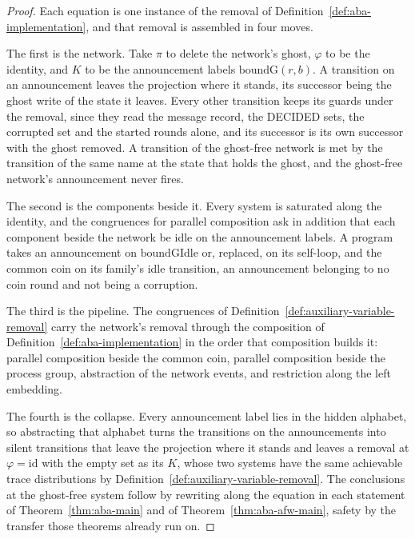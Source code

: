 \begin{proof}\leanok
  Each equation is one instance of the removal of Definition~\ref{def:aba-implementation}, and that removal is assembled in four moves.

  The first is the network.
  Take $\pi$ to delete the network's ghost, $\varphi$ to be the identity, and $K$ to be the announcement labels $\mathrm{boundG}(r,b)$.
  A transition on an announcement leaves the projection where it stands, its successor being the ghost write of the state it leaves.
  Every other transition keeps its guards under the removal, since they read the message record, the DECIDED sets, the corrupted set and the started rounds alone, and its successor is its own successor with the ghost removed.
  A transition of the ghost-free network is met by the transition of the same name at the state that holds the ghost, and the ghost-free network's announcement never fires.\leanok{}

  The second is the components beside it.
  Every system is saturated along the identity, and the congruences for parallel composition ask in addition that each component beside the network be idle on the announcement labels.
  A program takes an announcement on $\mathrm{boundGIdle}$ or, replaced, on its self-loop, and the common coin on its family's idle transition, an announcement belonging to no coin round and not being a corruption.\leanok{}

  The third is the pipeline.
  The congruences of Definition~\ref{def:auxiliary-variable-removal} carry the network's removal through the composition of Definition~\ref{def:aba-implementation} in the order that composition builds it: parallel composition beside the common coin, parallel composition beside the process group, abstraction of the network events, and restriction along the left embedding.

  The fourth is the collapse.
  Every announcement label lies in the hidden alphabet, so abstracting that alphabet turns the transitions on the announcements into silent transitions that leave the projection where it stands and leaves a removal at $\varphi = \mathrm{id}$ with the empty set as its $K$, whose two systems have the same achievable trace distributions by Definition~\ref{def:auxiliary-variable-removal}.\leanok{}
  The conclusions at the ghost-free system follow by rewriting along the equation in each statement of Theorem~\ref{thm:aba-main} and of Theorem~\ref{thm:aba-afw-main}, safety by the transfer those theorems already run on.
\end{proof}
